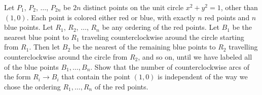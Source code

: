 Let $P_1$, $P_2$, $\dots$, $P_{2n}$ be $2n$ distinct points on the unit circle $x^2+y^2=1$, other than $(1,0)$. Each point is colored either red or blue, with exactly $n$ red points and $n$ blue points. Let $R_1$, $R_2$, $\dots$, $R_n$ be any ordering of the red points. Let $B_1$ be the nearest blue point to $R_1$ traveling counterclockwise around the circle starting from $R_1$. Then let $B_2$ be the nearest of the remaining blue points to $R_2$ travelling counterclockwise around the circle from $R_2$, and so on, until we have labeled all of the blue points $B_1, \dots, B_n$. Show that the number of counterclockwise arcs of the form $R_i \to B_i$ that contain the point $(1,0)$ is independent of the way we chose the ordering $R_1, \dots, R_n$ of the red points.